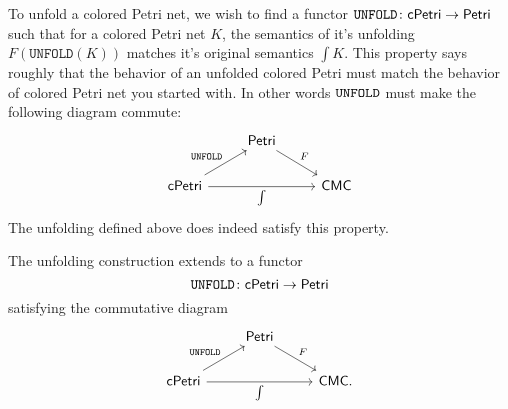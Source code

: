 To unfold a colored Petri net, we wish to find a functor $\mathtt{UNFOLD} \colon \mathsf{cPetri} \to \mathsf{Petri}$ such that for a colored Petri net $K$, the semantics of it's unfolding $F ( \mathtt{UNFOLD} (K) )$ matches it's original semantics $\int K$. This property says roughly that the behavior of an unfolded colored Petri must match the behavior of colored Petri net you started with. In other words $\mathtt{UNFOLD}$ must make the following diagram commute:
\[
\begin{tikzcd} 
& \Petri \ar[dr,"F"] & \\
\cPetri \ar[ur,"\UNFOLD"] \ar[rr,"\int",swap]  & &\CMC
\end{tikzcd}
\]
The unfolding defined above does indeed satisfy this property.

\begin{thm}\label{unfold}
    The unfolding construction extends to a functor
    \[ \mathtt{UNFOLD} \colon \mathsf{cPetri} \to \mathsf{Petri}\]
    satisfying the commutative diagram
\[
\begin{tikzcd} 
& \Petri \ar[dr,"F"] & \\
\cPetri \ar[ur,"\UNFOLD"] \ar[rr,"\int",swap]  & &\CMC.
\end{tikzcd}
\]
\end{thm}
